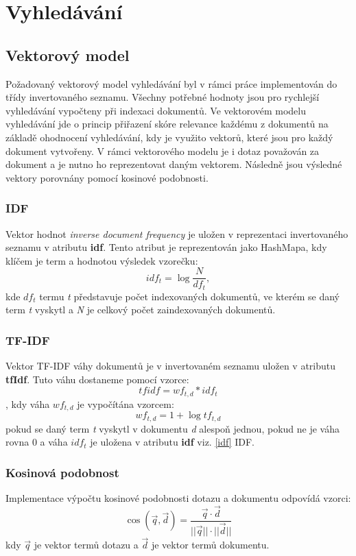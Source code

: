 \documentclass[
12pt,
a4paper,
pdftex,
czech,
titlepage
]{report}
\begin{document}
\section{Vyhledávání}
\subsection{Vektorový model}
Požadovaný vektorový model vyhledávání byl v rámci práce implementován do třídy invertovaného seznamu. Všechny potřebné hodnoty jsou pro rychlejší vyhledávání vypočteny při indexaci dokumentů. Ve vektorovém modelu vyhledávání jde o princip přiřazení skóre relevance každému z dokumentů na základě ohodnocení vyhledávání, kdy je využito vektorů, které jsou pro každý dokument vytvořeny. V rámci vektorového modelu je i dotaz považován za dokument a je nutno ho reprezentovat daným vektorem. Následně jsou výsledné vektory porovnány pomocí kosinové podobnosti.
\label{idf}
\subsubsection{IDF}
Vektor hodnot \textit{inverse document frequency} je uložen v reprezentaci invertovaného seznamu v atributu \textbf{idf}. Tento atribut je reprezentován jako HashMapa, kdy klíčem je term a hodnotou výsledek vzorečku:
$$idf_t=\log \frac{N}{df_t},$$
kde $df_{t}$ termu \textit{t} představuje počet indexovaných dokumentů, ve kterém se daný term \textit{t} vyskytl a \textit{N} je celkový počet zaindexovaných dokumentů.
\subsubsection{TF-IDF}
Vektor TF-IDF váhy dokumentů je v invertovaném seznamu uložen v atributu \textbf{tfIdf}. Tuto váhu dostaneme pomocí vzorce:
$$tfidf=wf_{t,d}*idf_t$$, kdy váha $wf_{t,d}$ je vypočítána vzorcem:
$$wf_{t,d}=1+\log tf_{t,d}$$ pokud se daný term \textit{t} vyskytl v dokumentu \textit{d} alespoň jednou, pokud ne je váha rovna 0 a váha $idf_t$ je uložena v atributu \textbf{idf} viz. \ref{idf} IDF.
\subsubsection{Kosinová podobnost}
Implementace výpočtu kosinové podobnosti dotazu a dokumentu odpovídá vzorci:
$$\cos(\vec{q},\vec{d})=\frac{\vec{q} \cdot \vec{d}}{||\vec{q}|| \cdot ||\vec{d}||}$$
kdy $\vec{q}$ je vektor termů dotazu a $\vec{d}$ je vektor termů dokumentu.
\end{document}
